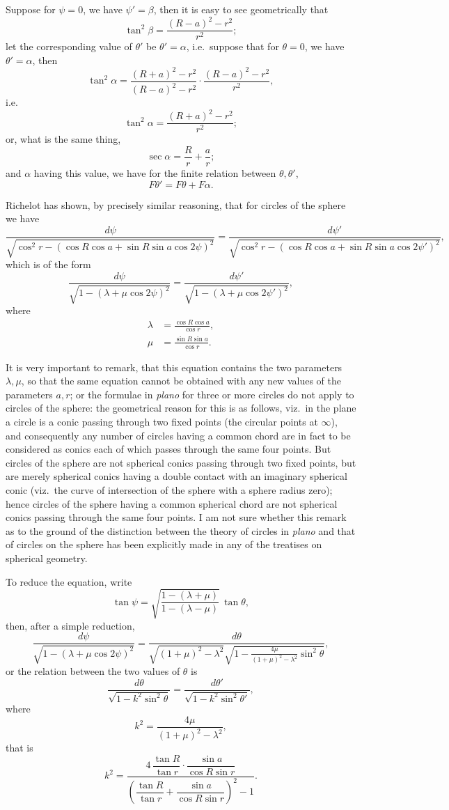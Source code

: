 \documentclass[12pt,a4paper]{article}
\theoremstyle{plain}
\begin{document}
\medskip

Suppose for $\psi=0$, we have $\psi'=\beta$, then it is easy to see geometrically that
\[
\tan^2\beta=\frac{(R-a)^2-r^2}{r^2};
\]
let the corresponding value of $\theta'$ be $\theta'=\alpha$, i.e.\ suppose that for $\theta=0$, we have $\theta'=\alpha$, then
\[
\tan^2\alpha=\frac{(R+a)^2-r^2}{(R-a)^2-r^2}\cdot\frac{(R-a)^2-r^2}{r^2},
\]
i.e.
\[
\tan^2\alpha=\frac{(R+a)^2-r^2}{r^2};
\]
or, what is the same thing,
\[
\sec\alpha=\frac{R}{r}+\frac{a}{r};
\]
and $\alpha$ having this value, we have for the finite relation between $\theta,\theta'$,
\[
F\theta'=F\theta+F\alpha.
\]

Richelot has shown, by precisely similar reasoning, that for circles of the sphere we have
\[
\frac{d\psi}{\sqrt{\cos^2 r-(\cos R\cos a+\sin R\sin a\cos 2\psi)^2}}=\frac{d\psi'}{\sqrt{\cos^2 r-(\cos R\cos a+\sin R\sin a\cos 2\psi')^2}},
\]
which is of the form
\[
\frac{d\psi}{\sqrt{1-(\lambda+\mu\cos 2\psi)^2}}=\frac{d\psi'}{\sqrt{1-(\lambda+\mu\cos 2\psi')^2}},
\]
where
\begin{align*}
\lambda &= \frac{\cos R\cos a}{\cos r},\\
\mu &= \frac{\sin R\sin a}{\cos r}.
\end{align*}

It is very important to remark, that this equation contains the two parameters $\lambda,\mu$, so that the same equation cannot be obtained with any new values of the parameters $a,r$; or the formulae in \textit{plano} for three or more circles do not apply to circles of the sphere: the geometrical reason for this is as follows, viz.\ in the plane a circle is a conic passing through two fixed points (the circular points at $\infty$), and consequently any number of circles having a common chord are in fact to be considered as conics each of which passes through the same four points. But circles of the sphere are not spherical conics passing through two fixed points, but are merely spherical conics having a double contact with an imaginary spherical conic (viz.\ the curve of intersection of the sphere with a sphere radius zero); hence circles of the sphere having a common spherical chord are not spherical conics passing through the same four points. I am not sure whether this remark as to the ground of the distinction between the theory of circles in \textit{plano} and that of circles on the sphere has been explicitly made in any of the treatises on spherical geometry.

\medskip

To reduce the equation, write
\[
\tan\psi=\sqrt{\frac{1-(\lambda+\mu)}{1-(\lambda-\mu)}}\,\tan\theta,
\]
then, after a simple reduction,
\[
\frac{d\psi}{\sqrt{1-(\lambda+\mu\cos 2\psi)^2}}=\frac{d\theta}{\sqrt{(1+\mu)^2-\lambda^2}\sqrt{1-\tfrac{4\mu}{(1+\mu)^2-\lambda^2}\sin^2\theta}},
\]
or the relation between the two values of $\theta$ is
\[
\frac{d\theta}{\sqrt{1-k^2\sin^2\theta}}=\frac{d\theta'}{\sqrt{1-k^2\sin^2\theta'}},
\]
where
\[
k^2=\frac{4\mu}{(1+\mu)^2-\lambda^2},
\]
that is
\[
k^2=\frac{4\,\dfrac{\tan R}{\tan r}\cdot\dfrac{\sin a}{\cos R\sin r}}{\left(\dfrac{\tan R}{\tan r}+\dfrac{\sin a}{\cos R\sin r}\right)^2-1}.
\]
\end{document}
